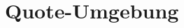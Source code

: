 \documentclass[10pt, a4paper]{article}
\begin{document}
\section{Quote-Umgebung}

\blindtext
\begin{quote}
\blindtext

\blindtext
\end{quote}

\newpage

\begin{quotation}
\blindtext

\blindtext
\end{quotation}
\blindtext
\end{document}
